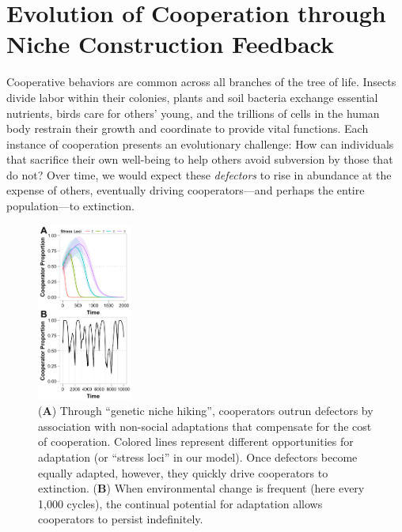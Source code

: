 \documentclass[10pt,]{article}
\date{}
\begin{document}
\section{Evolution of Cooperation through Niche Construction
Feedback}\label{evolution-of-cooperation-through-niche-construction-feedback}

Cooperative behaviors are common across all branches of the tree of
life. Insects divide labor within their colonies, plants and soil
bacteria exchange essential nutrients, birds care for others' young, and
the trillions of cells in the human body restrain their growth and
coordinate to provide vital functions. Each instance of cooperation
presents an evolutionary challenge: How can individuals that sacrifice
their own well-being to help others avoid subversion by those that do
not? Over time, we would expect these \emph{defectors} to rise in
abundance at the expense of others, eventually driving cooperators---and
perhaps the entire population---to extinction.

\begin{figure}                                   
    \centering                                                          
    \vspace{-2.2em}
    \includegraphics[width=0.278\textwidth]{figures/Figure1all} 
    \caption{(\textbf{A}) Through ``genetic niche hiking'', cooperators
    outrun defectors by association with non-social adaptations that
    compensate for the cost of cooperation. Colored lines represent
    different opportunities for adaptation (or ``stress loci'' in our
    model). Once defectors become equally adapted, however, they quickly
    drive cooperators to extinction. (\textbf{B}) When environmental change
    is frequent (here every 1,000 cycles), the continual potential for
    adaptation allows cooperators to persist indefinitely.}
    \label{fig1}
    \vspace{-2em}
\end{figure} 
\end{document}
